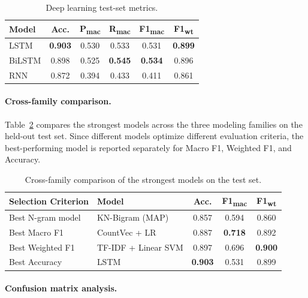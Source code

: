 \documentclass[11pt,a4paper]{article}
\begin{document}
\begin{table}[h!]
\centering
\caption{Deep learning test-set metrics.}
\label{tab:dl_test}
\begin{tabular}{lccccc}
\toprule
\textbf{Model} & \textbf{Acc.} &
  \textbf{P\textsubscript{mac}} & \textbf{R\textsubscript{mac}} &
  \textbf{F1\textsubscript{mac}} & \textbf{F1\textsubscript{wt}} \\
\midrule
LSTM   & \textbf{0.903} & 0.530 & 0.533 & 0.531 & \textbf{0.899} \\
BiLSTM & 0.898 & 0.525 & \textbf{0.545} & \textbf{0.534} & 0.896 \\
RNN    & 0.872 & 0.394 & 0.433 & 0.411 & 0.861 \\
\bottomrule
\end{tabular}
\end{table}

\paragraph{Cross-family comparison.}

Table~\ref{tab:overall} compares the strongest models across the three
modeling families on the held-out test set. Since different models optimize
different evaluation criteria, the best-performing model is reported separately
for Macro F1, Weighted F1, and Accuracy.

\begin{table}[h!]
\centering
\caption{Cross-family comparison of the strongest models on the test set.}
\label{tab:overall}
\begin{tabular}{llccc}
\toprule
\textbf{Selection Criterion} &
\textbf{Model} &
\textbf{Acc.} &
\textbf{F1\textsubscript{mac}} &
\textbf{F1\textsubscript{wt}} \\
\midrule
Best N-gram model &
KN-Bigram (MAP) &
0.857 & 0.594 & 0.860 \\

Best Macro F1 &
CountVec + LR &
0.887 & \textbf{0.718} & 0.892 \\

Best Weighted F1 &
TF-IDF + Linear SVM &
0.897 & 0.696 & \textbf{0.900} \\

Best Accuracy &
LSTM &
\textbf{0.903} & 0.531 & 0.899 \\
\bottomrule
\end{tabular}
\end{table}

\paragraph{Confusion matrix analysis.}
\end{document}
